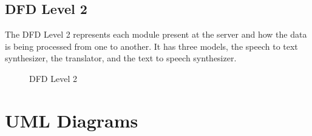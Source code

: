 \clearpage
\subsection{DFD Level 2}
{\normalsize{The DFD Level 2 represents each module present at the server and how the data is being processed from one to another. It has three models, the speech to text synthesizer, the translator, and the text to speech synthesizer.}}
\newline
\newline
\begin{figure}[h]
  \begin{center}
  \caption{DFD Level 2}
  \end{center}
\end{figure}

\clearpage
\section{UML Diagrams}
